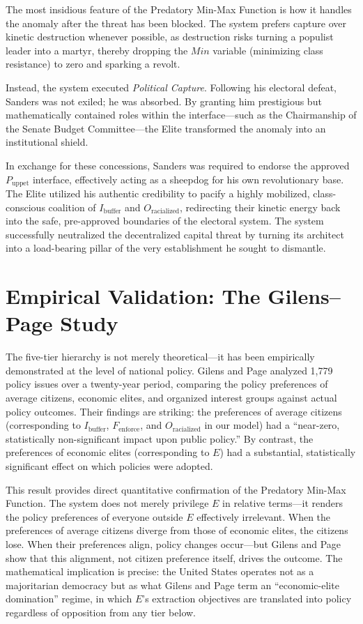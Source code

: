 \documentclass[12pt,openany]{book}
\begin{document}
The most insidious feature of the Predatory Min-Max Function is how it handles the anomaly after the threat has been blocked. The system prefers capture over kinetic destruction whenever possible, as destruction risks turning a populist leader into a martyr, thereby dropping the $Min$ variable (minimizing class resistance) to zero and sparking a revolt.

Instead, the system executed \textit{Political Capture}. Following his electoral defeat, Sanders was not exiled; he was absorbed. By granting him prestigious but mathematically contained roles within the interface---such as the Chairmanship of the Senate Budget Committee---the Elite transformed the anomaly into an institutional shield.

In exchange for these concessions, Sanders was required to endorse the approved $P_{\text{uppet}}$ interface, effectively acting as a sheepdog for his own revolutionary base. The Elite utilized his authentic credibility to pacify a highly mobilized, class-conscious coalition of $I_{\text{buffer}}$ and $O_{\text{racialized}}$, redirecting their kinetic energy back into the safe, pre-approved boundaries of the electoral system. The system successfully neutralized the decentralized capital threat by turning its architect into a load-bearing pillar of the very establishment he sought to dismantle.

\section{Empirical Validation: The Gilens--Page Study}

The five-tier hierarchy is not merely theoretical---it has been empirically demonstrated at the level of national policy. Gilens and Page \cite{gilens} analyzed 1,779 policy issues over a twenty-year period, comparing the policy preferences of average citizens, economic elites, and organized interest groups against actual policy outcomes. Their findings are striking: the preferences of average citizens (corresponding to $I_{\text{buffer}}$, $F_{\text{enforce}}$, and $O_{\text{racialized}}$ in our model) had a ``near-zero, statistically non-significant impact upon public policy.'' By contrast, the preferences of economic elites (corresponding to $E$) had a substantial, statistically significant effect on which policies were adopted.

This result provides direct quantitative confirmation of the Predatory Min-Max Function. The system does not merely privilege $E$ in relative terms---it renders the policy preferences of everyone outside $E$ effectively irrelevant. When the preferences of average citizens diverge from those of economic elites, the citizens lose. When their preferences align, policy changes occur---but Gilens and Page show that this alignment, not citizen preference itself, drives the outcome. The mathematical implication is precise: the United States operates not as a majoritarian democracy but as what Gilens and Page term an ``economic-elite domination'' regime, in which $E$'s extraction objectives are translated into policy regardless of opposition from any tier below.
\end{document}
